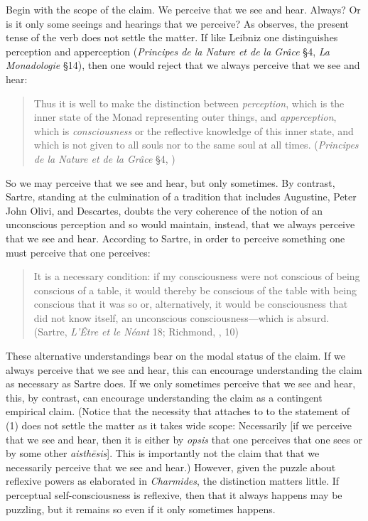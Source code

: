 Begin with the scope of the claim. We perceive that we see and hear. Always? Or is it only some seeings and hearings that we perceive? As \citet[]{McCabe:2007jb} observes, the present tense of the verb does not settle the matter. If like Leibniz one distinguishes perception and apperception (\emph{Principes de la Nature et de la Grâce} §4, \emph{La Monadologie} §14), then one would reject that we always perceive that we see and hear:
\begin{quote}
	Thus it is well to make the distinction between \emph{perception}, which is the inner state of the Monad representing outer things, and \emph{apperception}, which is \emph{consciousness} or the reflective knowledge of this inner state, and which is not given to all souls nor to the same soul at all times. (\emph{Principes de la Nature et de la Grâce} §4, \citealt[411]{Latta:1898aa})
\end{quote}
So we may perceive that we see and hear, but only sometimes. By contrast, Sartre, standing at the culmination of a tradition that includes Augustine, Peter John Olivi, and Descartes, doubts the very coherence of the notion of an unconscious perception and so would maintain, instead, that we always perceive that we see and hear. According to Sartre, in order to perceive something one must perceive that one perceives: 
\begin{quote}
	It is a necessary condition: if my consciousness were not conscious of being conscious of a table, it would thereby be conscious of the table with being conscious that it was so or, alternatively, it would be consciousness that did not know itself, an unconscious consciousness—which is absurd. (Sartre, \emph{L'Être et le Néant} 18; Richmond, \citeyear{Sartre:2018aa}, 10)
\end{quote}
These alternative understandings bear on the modal status of the claim. If we always perceive that we see and hear, this can encourage understanding the claim as necessary as Sartre does. If we only sometimes perceive that we see and hear, this, by contrast, can encourage understanding the claim as a contingent empirical claim. (Notice that the necessity that attaches to to the statement of (1) does not settle the matter as it takes wide scope: Necessarily [if we perceive that we see and hear, then it is either by \emph{opsis} that one perceives that one sees or by some other \emph{aisthēsis}]. This is importantly not the claim that that we necessarily perceive that we see and hear.) However, given the puzzle about reflexive powers as elaborated in \emph{Charmides}, the distinction matters little. If perceptual self-consciousness is reflexive, then that it always happens may be puzzling, but it remains so even if it only sometimes happens.

